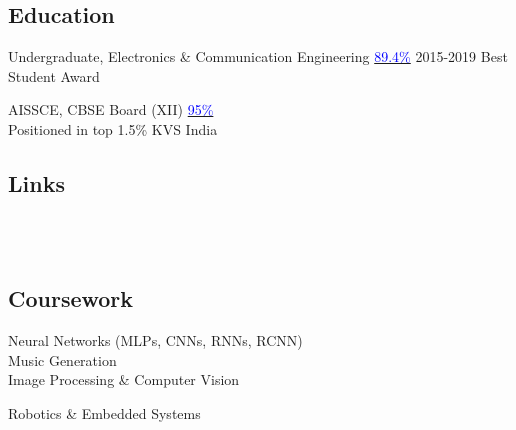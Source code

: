 \documentclass[]{deedy-resume-openfont}
\begin{document}
\begin{minipage}[t]{0.33\textwidth} 

\subsection{Education} 

Undergraduate, Electronics \& Communication Engineering \textbullet{}\underline{\textcolor{blue}{89.4\%}} \textbullet{}2015-2019 \textbullet{}Best Student Award
\sectionsep


AISSCE, CBSE Board (XII) \textbullet{}\underline{\textcolor{blue}{95\%}}\\
\textbullet{}Positioned in top 1.5\% KVS India
\sectionsep


\hline
\sectionsep
\subsection{Links} 
\href{https://sites.google.com/view/chetanchawla}{}\\ 
\href{https://www.linkedin.com/in/chetan-chawla/}{}\\
\href{https://github.com/chetanchawla}{} 
\sectionsep

\hline
\sectionsep
\subsection{Coursework}
\vspace{-0.03in}
\vspace{0.01in}
\textbullet{}
Neural Networks (MLPs, CNNs, RNNs, RCNN)\\
\textbullet{}
Music Generation\\
\textbullet{}
Image Processing \& Computer Vision
\vspace{0.05in}

\vspace{0.05in}
\textbullet{} Robotics \& Embedded Systems
\sectionsep



\end{minipage}
\end{document}
